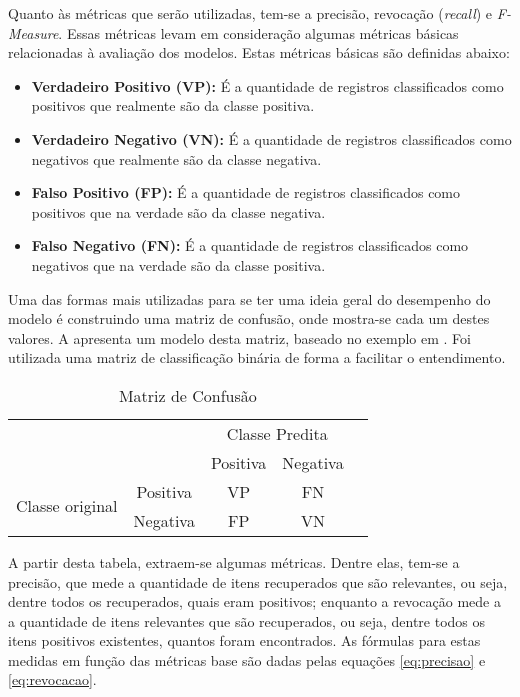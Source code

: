 Quanto às métricas que serão utilizadas, tem-se a precisão, revocação (\textit{recall}) e \textit{F-Measure}. Essas métricas levam em consideração algumas métricas básicas relacionadas à avaliação dos modelos. Estas métricas básicas são definidas abaixo:
\begin{itemize}
\item\textbf{ Verdadeiro Positivo (VP):} É a quantidade de registros classificados como positivos que realmente são da classe positiva.
\item \textbf{Verdadeiro Negativo (VN): }É a quantidade de registros classificados como negativos que realmente são da classe negativa.
\item \textbf{Falso Positivo (FP):} É a quantidade de registros classificados como positivos que na verdade são da classe negativa.
\item \textbf{Falso Negativo (FN):} É a quantidade de registros classificados como negativos que na verdade são da classe positiva.
\end{itemize}
 Uma das formas mais utilizadas para se ter uma ideia geral do desempenho do modelo é construindo uma matriz de confusão, onde mostra-se cada um destes valores. A    apresenta um modelo desta matriz, baseado no exemplo em \cite{silva_introducao_2016}. Foi utilizada uma matriz de classificação binária de forma a facilitar o entendimento.
 \begin{table}[]
\centering
\caption{Matriz de Confusão}
\label{matrizConfusao}
\begin{tabular}{|c|c|c|c|l}
\cline{1-4}
\multicolumn{2}{|c|}{\multirow{2}{*}{}}     & \multicolumn{2}{c|}{Classe Predita} &  \\ \cline{3-4}
\multicolumn{2}{|c|}{}                      & Positiva         & Negativa         &  \\ \cline{1-4}
\multirow{2}{*}{Classe original} & Positiva & VP               & FN               &  \\ \cline{2-4}
                                 & Negativa & FP               & VN               &  \\ \cline{1-4}
\end{tabular}
\end{table}

A partir desta tabela, extraem-se algumas métricas. Dentre elas, tem-se a precisão, que mede a quantidade de itens recuperados que são relevantes, ou seja, dentre todos os recuperados, quais eram positivos; enquanto a revocação mede a a quantidade de itens relevantes que são recuperados, ou seja, dentre todos os itens positivos existentes, quantos foram encontrados. As fórmulas para estas medidas em função das métricas base são dadas pelas equações \ref{eq:precisao} e \ref{eq:revocacao}.

